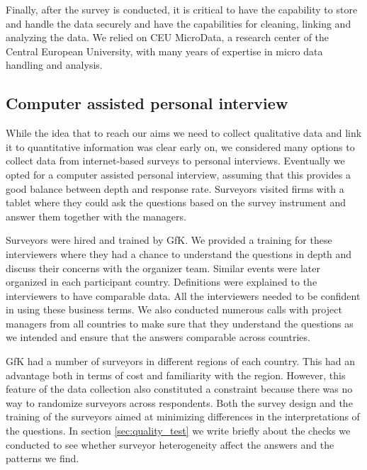 \documentclass[final, dvipsnames, authoryear,12pt]{elsarticle}
\begin{document}
Finally, after the survey is conducted, it is critical to have the capability to store and handle the data securely and have the capabilities for cleaning, linking and analyzing the data. We relied on CEU MicroData, a research center of the Central European University, with many years of expertise in micro data handling and analysis. 

\subsection{Computer assisted personal interview}

While the idea that to reach our aims we need to collect qualitative data and link it to quantitative information was clear early on, we considered many options to collect data from internet-based surveys to personal interviews. Eventually we opted for a computer assisted personal interview, assuming that this provides a good balance between depth and response rate. Surveyors visited firms with a tablet where they could ask the questions based on the survey instrument and answer them together with the managers.


Surveyors were hired and trained by GfK. We provided a training for these interviewers where they had a chance to understand the questions in depth and discuss their concerns with the organizer team. Similar events were later organized in each participant country. Definitions were explained to the interviewers to have comparable data. All the interviewers needed to be confident in using these business terms. We also conducted numerous calls with project managers from all countries to make sure that they understand the questions as we intended and ensure that the answers comparable across countries. 

GfK had a number of surveyors in different regions of each country. This had an advantage both in terms of cost and familiarity with the region. However, this feature of the data collection also constituted a constraint because there was no way to randomize surveyors across respondents. Both the survey design and the training of the surveyors aimed at minimizing differences in the interpretations of the questions. In section \ref{sec:quality_test} we write briefly about the checks we conducted to see whether surveyor heterogeneity affect the answers and the patterns we find.
\end{document}

